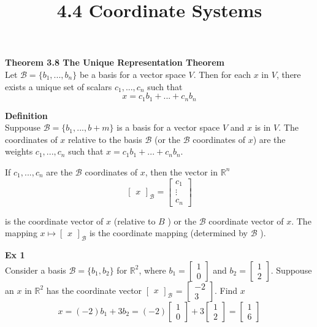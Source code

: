 \documentclass{article}
\title{4.4 Coordinate Systems}
\begin{document}
  \maketitle
  \textbf{Theorem 3.8 The Unique Representation Theorem}\\
  Let $ \mathcal{B}=\{ b_1,...,b_n \} $ be a basis for a vector space $ V $. Then for each $ x $ in $ V $, there exists a unique set of scalars $ c_1,...,c_n $ such that
  \[
    x=c_1b_1+...+c_nb_n
  \]

  \textbf{Definition}\\
  Suppouse $ \mathcal{B}=\{ b_1,...,b+m \} $ is a basis for a vector space $ V $ and $ x $ is in $ V $. The coordinates of $ x $ relative to the basis $ \mathcal{B} $ (or the $ \mathcal{B} $ coordinates of $ x$) are the weights $ c_1,...,c_n $ such that $ x=c_1b_1+...+c_nb_n $. 
  
  If $ c_1,...,c_n $ are the $ \mathcal{B} $ coordinates of $ x $, then the vector in $ \mathbb{R}^{n} $
  \[
    \begin{bmatrix}
      x
    \end{bmatrix}_\mathcal{B}=\begin{bmatrix}
      c_1\\
      \vdots\\
      c_n
    \end{bmatrix}
  \]

  is the coordinate vector of $ x $ (relative to $ B $ ) or the $ \mathcal{B} $ coordinate vector of $ x $. The mapping $ x \mapsto \begin{bmatrix}
    x
  \end{bmatrix}_\mathcal{B} $ is the coordinate mapping (determined by $ \mathcal{B} $ ).

  \textbf{Ex 1}\\
  Consider a basis $ \mathcal{B}=\{ b_1,b_2 \} $ for $ \mathbb{R}^{2} $, where $ b_1=\begin{bmatrix}
    1\\
    0
  \end{bmatrix} $ and $ b_2=\begin{bmatrix}
    1\\
    2
  \end{bmatrix} $. Suppouse an $ x $ in $ \mathbb{R}^{2} $ has the coordinate vector $\begin{bmatrix}
    x
  \end{bmatrix}_\mathcal{B} $ = $ \begin{bmatrix}
    -2\\
    3
  \end{bmatrix} $. Find $ x $ 
  \[
    x=(-2)b_1+3b_2=(-2)\begin{bmatrix}
      1\\
      0
    \end{bmatrix}+3\begin{bmatrix}
      1\\
      2
    \end{bmatrix} =
    \begin{bmatrix}
      1\\
      6
    \end{bmatrix}
  \]
\end{document}
